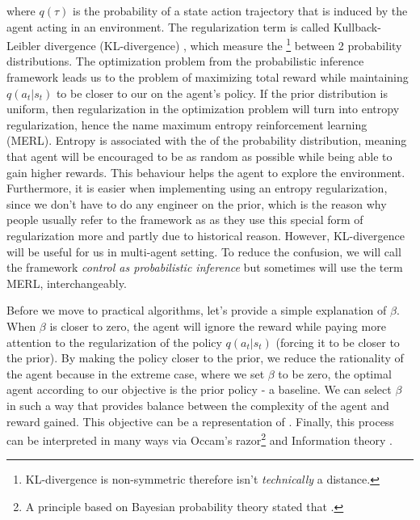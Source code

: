 where $q(\tau)$ is the probability of a state action trajectory that is induced by the agent acting in an environment. The regularization term is called Kullback-Leibler divergence (KL-divergence) \cite{kullback1951information, sherman1960solomon}, which measure the \footnote{KL-divergence is non-symmetric therefore isn't \textit{technically} a distance.} between 2 probability distributions. The optimization problem from the probabilistic inference framework leads us to the problem of maximizing total reward while maintaining $q(a_t | s_t)$ to be closer to our  on the agent's policy. If the prior distribution is uniform, then regularization in the optimization problem will turn into entropy regularization, hence the name maximum entropy reinforcement learning (MERL). Entropy is associated with the  of the probability distribution, meaning that agent will be encouraged to be as random as possible while being able to gain higher rewards. This behaviour helps the agent to explore the environment. Furthermore, it is easier when implementing using an entropy regularization, since we don't have to do any engineer on the prior, which is the reason why people usually refer to the framework as  as they use this special form of regularization more and partly due to historical reason. However, KL-divergence will be useful for us in multi-agent setting. To reduce the confusion, we will call the framework \textit{control as probabilistic inference} but sometimes will use the term MERL, interchangeably. 

Before we move to practical algorithms, let's provide a simple explanation of $\beta$. When $\beta$ is closer to zero, the agent will ignore the reward while paying more attention to the regularization of the policy $q(a_t | s_t)$ (forcing it to be closer to the prior). By making the policy closer to the prior, we reduce the rationality of the agent because in the extreme case, where we set $\beta$ to be zero, the optimal agent according to our objective is the prior policy - a baseline. We can select $\beta$ in such a way that provides balance between the complexity of the agent and reward gained. This objective can be a representation of . Finally, this process can be interpreted in many ways via Occam's razor\footnote{A principle based on Bayesian probability theory stated that  \cite{mackay2003information}.} and Information theory \cite{ortega2013thermodynamics, tim2015bounded}.


